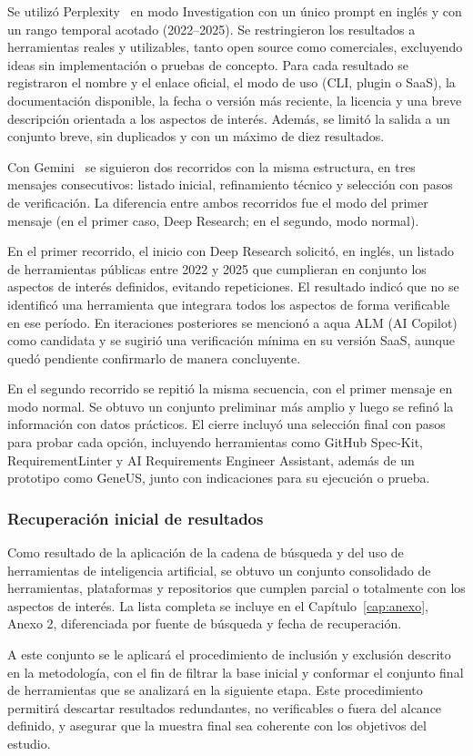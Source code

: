Se utilizó Perplexity~\cite{perplexity} en modo Investigation con un único prompt en inglés y con un rango temporal acotado (2022--2025). Se restringieron los resultados a herramientas reales y utilizables, tanto open source como comerciales, excluyendo ideas sin implementación o pruebas de concepto. Para cada resultado se registraron el nombre y el enlace oficial, el modo de uso (CLI, plugin o SaaS), la documentación disponible, la fecha o versión más reciente, la licencia y una breve descripción orientada a los aspectos de interés. Además, se limitó la salida a un conjunto breve, sin duplicados y con un máximo de diez resultados.

Con Gemini~\cite{gemini} se siguieron dos recorridos con la misma estructura, en tres mensajes consecutivos: listado inicial, refinamiento técnico y selección con pasos de verificación. La diferencia entre ambos recorridos fue el modo del primer mensaje (en el primer caso, Deep Research; en el segundo, modo normal).

En el primer recorrido, el inicio con Deep Research solicitó, en inglés, un listado de herramientas públicas entre 2022 y 2025 que cumplieran en conjunto los aspectos de interés definidos, evitando repeticiones. El resultado indicó que no se identificó una herramienta que integrara todos los aspectos de forma verificable en ese período. En iteraciones posteriores se mencionó a aqua ALM (AI Copilot) como candidata y se sugirió una verificación mínima en su versión SaaS, aunque quedó pendiente confirmarlo de manera concluyente.

En el segundo recorrido se repitió la misma secuencia, con el primer mensaje en modo normal. Se obtuvo un conjunto preliminar más amplio y luego se refinó la información con datos prácticos. El cierre incluyó una selección final con pasos para probar cada opción, incluyendo herramientas como GitHub Spec-Kit, RequirementLinter y AI Requirements Engineer Assistant, además de un prototipo como GeneUS, junto con indicaciones para su ejecución o prueba.

\subsubsection{Recuperación inicial de resultados}
Como resultado de la aplicación de la cadena de búsqueda y del uso de herramientas de inteligencia artificial, se obtuvo un conjunto consolidado de herramientas, plataformas y repositorios que cumplen parcial o totalmente con los aspectos de interés. La lista completa se incluye en el Capítulo~\ref{cap:anexo}, Anexo 2, diferenciada por fuente de búsqueda y fecha de recuperación.

A este conjunto se le aplicará el procedimiento de inclusión y exclusión descrito en la metodología, con el fin de filtrar la base inicial y conformar el conjunto final de herramientas que se analizará en la siguiente etapa. Este procedimiento permitirá descartar resultados redundantes, no verificables o fuera del alcance definido, y asegurar que la muestra final sea coherente con los objetivos del estudio.

